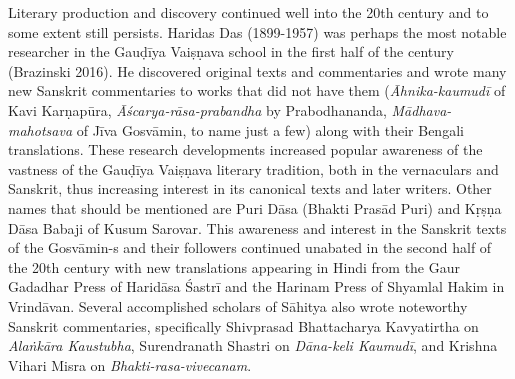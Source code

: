 Literary production and discovery continued well into the 20th century and to some extent still persists. Haridas Das (1899-1957) was perhaps the most notable researcher in the Gauḍīya Vaiṣṇava school in the first half of the century (Brazinski 2016). He discovered original texts and commentaries and wrote many new Sanskrit commentaries to works that did not have them ({\sl Āhnika-kaumudī} of Kavi Karṇapūra, {\sl Āścarya-rāsa-prabandha} by Prabodhananda, {\sl Mādhava-mahotsava} of Jīva Gosvāmin, to name just a few) along with their Bengali translations. These research developments increased popular awareness of the vastness of the Gauḍīya Vaiṣṇava literary tradition, both in the vernaculars and Sanskrit, thus increasing interest in its canonical texts and later writers. Other names that should be mentioned are Puri Dāsa (Bhakti Prasād Puri) and Kṛṣṇa Dāsa Babaji of Kusum Sarovar. This awareness and interest in the Sanskrit texts of the Gosvāmin-s and their followers continued unabated in the second half of the 20th century with new translations appearing in Hindi from the Gaur Gadadhar Press of Haridāsa Śastrī and the Harinam Press of Shyamlal Hakim in Vrindāvan. Several accomplished scholars of Sāhitya also wrote noteworthy Sanskrit commentaries, specifically Shivprasad Bhattacharya Kavyatirtha on {\sl Alaṅkāra Kaustubha}, Surendranath Shastri on {\sl Dāna-keli Kaumudī}, and Krishna Vihari Misra on {\sl Bhakti-rasa-vivecanam}. 

